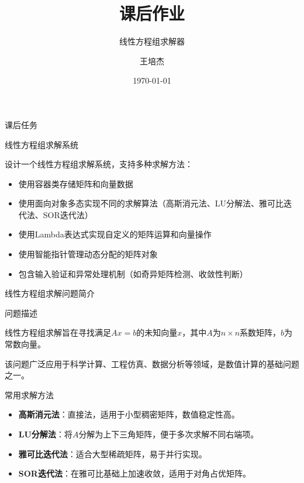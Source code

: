 \documentclass[UTF8,aspectratio=169]{beamer}
\title{课后作业}
\subtitle{线性方程组求解器}
\author{王培杰}
\institute{长江大学地球物理与石油资源学院}
\date{\today}
\begin{document}
\begin{frame}{课后任务}
    \begin{ytublock}{线性方程组求解系统}
        \item 设计一个线性方程组求解系统，支持多种求解方法：
        \begin{itemize}
            \item 使用容器类存储矩阵和向量数据
            \item 使用面向对象多态实现不同的求解算法（高斯消元法、LU分解法、雅可比迭代法、SOR迭代法）
            \item 使用Lambda表达式实现自定义的矩阵运算和向量操作
            \item 使用智能指针管理动态分配的矩阵对象
            \item 包含输入验证和异常处理机制（如奇异矩阵检测、收敛性判断）
        \end{itemize}
    \end{ytublock}
\end{frame}

\begin{frame}{线性方程组求解问题简介}
    \begin{ytublock}{问题描述}
        \item 线性方程组求解旨在寻找满足$Ax=b$的未知向量$x$，其中$A$为$n\times n$系数矩阵，$b$为常数向量。
        \item 该问题广泛应用于科学计算、工程仿真、数据分析等领域，是数值计算的基础问题之一。
    \end{ytublock}
    \begin{ytublock}{常用求解方法}
        \begin{itemize}
            \item \textbf{高斯消元法}：直接法，适用于小型稠密矩阵，数值稳定性高。
            \item \textbf{LU分解法}：将$A$分解为上下三角矩阵，便于多次求解不同右端项。
            \item \textbf{雅可比迭代法}：适合大型稀疏矩阵，易于并行实现。
            \item \textbf{SOR迭代法}：在雅可比基础上加速收敛，适用于对角占优矩阵。
        \end{itemize}
    \end{ytublock}
\end{frame}
\end{document}
